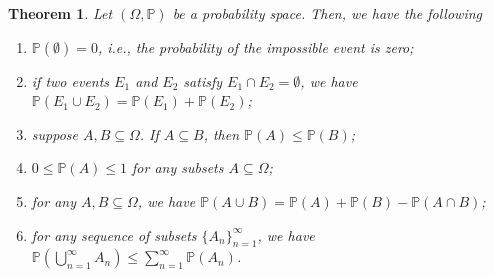 \documentclass[11pt,letterpaper, leqno]{article}
\newtheorem{theorem}{Theorem}
\numberwithin{equation}{section}
\numberwithin{theorem}{section}
\numberwithin{lemma}{section}
\numberwithin{corollary}{section}
\numberwithin{definition}{section}
\numberwithin{proposition}{section}
\numberwithin{remark}{section}
\numberwithin{example}{section}
\begin{document}
\begin{theorem}\label{thm: properties directly follows from the def of prob spaces}
    Let $(\Omega, \mathbb{P})$ be a probability space. Then, we have the following
    \begin{enumerate}
        \item $\mathbb{P}(\emptyset)=0$, i.e., the probability of the impossible event is zero;
        
        \item if two events $E_1$ and $E_2$ satisfy $E_1\cap E_2=\emptyset$, we have $\mathbb{P}(E_1\cup E_2)=\mathbb{P}(E_1)+ \mathbb{P}(E_2)$;
        
        \item suppose $A,B\subseteq\Omega$. If $A\subseteq B$, then $\mathbb{P}(A)\le \mathbb{P}(B)$;
        
        \item $0\le \mathbb{P}(A) \le 1$ for any subsets $A \subseteq \Omega$; 
        
        \item for any $A,B\subseteq\Omega$, we have $\mathbb{P}(A\cup B)=\mathbb{P}(A)+\mathbb{P}(B)-\mathbb{P}(A\cap B)$;
        
        \item for any sequence of subsets $\{A_n\}_{n=1}^\infty$, we have $\mathbb{P}(\bigcup_{n=1}^\infty A_n)\le\sum_{n=1}^\infty\mathbb{P}(A_n)$.
    \end{enumerate}
\end{theorem}
\end{document}
